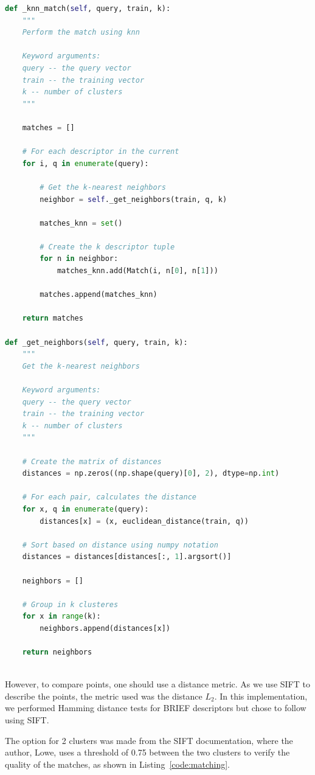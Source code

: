 \documentclass[]{IEEEtran}
\begin{document}
 \begin{lstlisting}[language=Python, caption={K-nearest neighbors}, label={code:knn}]
 def _knn_match(self, query, train, k):
    """
    Perform the match using knn

    Keyword arguments:
    query -- the query vector
    train -- the training vector
    k -- number of clusters
    """

    matches = []

    # For each descriptor in the current
    for i, q in enumerate(query):

        # Get the k-nearest neighbors
        neighbor = self._get_neighbors(train, q, k)

        matches_knn = set()

        # Create the k descriptor tuple
        for n in neighbor:
            matches_knn.add(Match(i, n[0], n[1]))

        matches.append(matches_knn)

    return matches

def _get_neighbors(self, query, train, k):
    """
    Get the k-nearest neighbors

    Keyword arguments:
    query -- the query vector
    train -- the training vector
    k -- number of clusters
    """

    # Create the matrix of distances
    distances = np.zeros((np.shape(query)[0], 2), dtype=np.int)

    # For each pair, calculates the distance
    for x, q in enumerate(query):
        distances[x] = (x, euclidean_distance(train, q))

    # Sort based on distance using numpy notation
    distances = distances[distances[:, 1].argsort()]

    neighbors = []

    # Group in k clusteres
    for x in range(k):
        neighbors.append(distances[x])

    return neighbors
    
\end{lstlisting}

However, to compare points, one should use a distance metric. As we use SIFT to describe the points, the metric used was the distance $L_2$. In this implementation, we performed Hamming distance tests for BRIEF descriptors but chose to follow using SIFT.

The option for 2 clusters was made from the SIFT documentation, where the author, Lowe, uses a threshold of 0.75 between the two clusters to verify the quality of the matches, as shown in Listing~\ref{code:matching}.
\end{document}
